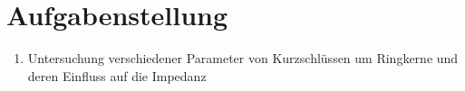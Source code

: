 \section{Aufgabenstellung}
    \begin{enumerate}
        \item Untersuchung verschiedener Parameter von Kurzschlüssen um Ringkerne und deren Einfluss auf die Impedanz
    \end{enumerate}